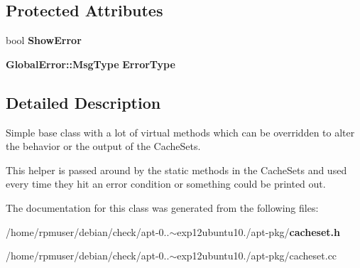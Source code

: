 \subsection*{\-Protected \-Attributes}
\begin{DoxyCompactItemize}
\item 
bool {\bfseries \-Show\-Error}\label{classAPT_1_1CacheSetHelper_ac8a78ec3420af78bc9c267037796ae30}

\item 
{\bf \-Global\-Error\-::\-Msg\-Type} {\bfseries \-Error\-Type}\label{classAPT_1_1CacheSetHelper_a87f795887eac5fd7f1db494585de5681}

\end{DoxyCompactItemize}


\subsection{\-Detailed \-Description}
\-Simple base class with a lot of virtual methods which can be overridden to alter the behavior or the output of the \-Cache\-Sets.

\-This helper is passed around by the static methods in the \-Cache\-Sets and used every time they hit an error condition or something could be printed out. 

\-The documentation for this class was generated from the following files\-:\begin{DoxyCompactItemize}
\item 
/home/rpmuser/debian/check/apt-\/0..$\sim$exp12ubuntu10./apt-\/pkg/{\bf cacheset.\-h}\item 
/home/rpmuser/debian/check/apt-\/0..$\sim$exp12ubuntu10./apt-\/pkg/cacheset.\-cc\end{DoxyCompactItemize}
